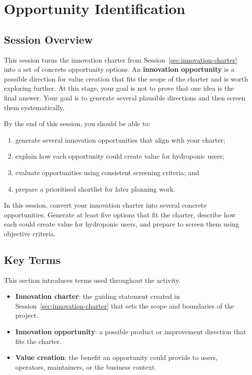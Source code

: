 \chapter{Opportunity Identification}
\label{ch:opportunity-identification}

\section{Session Overview}

This session turns the innovation charter from Session~\ref{sec:innovation-charter} into a set of concrete opportunity options. An \textbf{innovation opportunity} is a possible direction for value creation that fits the scope of the charter and is worth exploring further. At this stage, your goal is not to prove that one idea is the final answer. Your goal is to generate several plausible directions and then screen them systematically.

By the end of this session, you should be able to:
\begin{enumerate}
    \item generate several innovation opportunities that align with your charter;
    \item explain how each opportunity could create value for hydroponic users;
    \item evaluate opportunities using consistent screening criteria; and
    \item prepare a prioritised shortlist for later planning work.
\end{enumerate}

\begin{tcolorbox}[title=Goal]
In this session, convert your innovation charter into several concrete opportunities. Generate at least five options that fit the charter, describe how each could create value for hydroponic users, and prepare to screen them using objective criteria.
\end{tcolorbox}

\section{Key Terms}

This section introduces terms used throughout the activity.

\begin{itemize}
    \item \textbf{Innovation charter}: the guiding statement created in Session~\ref{sec:innovation-charter} that sets the scope and boundaries of the project.
    \item \textbf{Innovation opportunity}: a possible product or improvement direction that fits the charter.
    \item \textbf{Value creation}: the benefit an opportunity could provide to users, operators, maintainers, or the business context.
\end{itemize}

